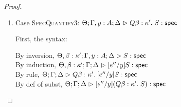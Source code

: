 \begin{proof}
\begin{enumerate}
  For semantics, consider
  $\interp{\judgeS[\Theta; \Gamma; \Delta]
                  {[e''/y](Q x:A.\;S)}}\;\theta\;\gamma\;\delta$ 
  \begin{eqnproof}
          {Semantics}
          {Induction}
          {Semantics}
  \end{eqnproof}

\item Case \textsc{SpecQuantify3}: $\judgeS[\Theta; \Gamma, y:A; \Delta]{Q \beta:\kappa'.\;S}$
  
  First, the syntax:
  \begin{tabbedproof}
    \oo By inversion, $\judgeS[\Theta, \beta:\kappa'; \Gamma, y:A; \Delta]{S}$ \\
    \oo By induction, $\judgeS[\Theta, \beta:\kappa'; \Gamma; \Delta]{[e''/y]S}$ \\
    \oo By rule, $\judgeS[\Theta; \Gamma; \Delta]
                         {Q \beta:\kappa'.\;[e''/y]S}$ \\
    \oo By def of subst, $\judgeS[\Theta; \Gamma; \Delta]
                                 {[e''/y](Q \beta:\kappa'.\;S)}$ 
  \end{tabbedproof}


\end{enumerate}
\end{proof}
